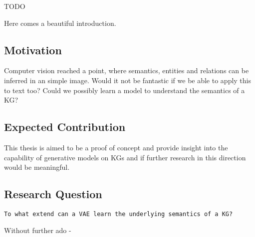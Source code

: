 
TODO

Here comes a beautiful introduction. %


\subsection{Motivation}

Computer vision reached a point, where semantics, entities and relations can be inferred in an simple image.
Would it not be fantastic if we be able to apply this to text too?
Could we possibly learn a model to understand the semantics of a KG?

\subsection{Expected Contribution}

This thesis is aimed to be a proof of concept and provide insight into the capability of generative models on KGs and if further research in this direction would be meaningful.

\subsection{Research Question}

\texttt{To what extend can a VAE learn the underlying semantics of a KG?}


Without further ado -
